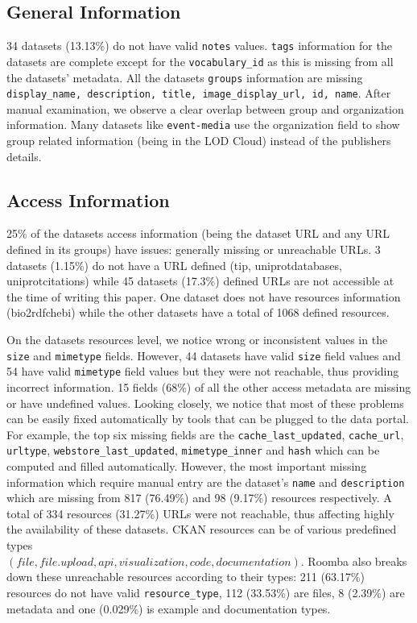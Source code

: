 \subsection{General Information}
34 datasets (13.13\%) do not have valid \texttt{notes} values. \texttt{tags} information for the datasets are complete except for the \texttt{vocabulary\_id} as this is missing from all the datasets' metadata. All the datasets \texttt{groups} information are missing \texttt{display\_name, description, title, image\_display\_url, id, name}. After manual examination, we observe a clear overlap between group and organization information. Many datasets like \texttt{event-media} use the organization field to show group related information (being in the LOD Cloud) instead of the publishers details.

\subsection{Access Information}
25\% of the datasets access information (being the dataset URL and any URL defined in its groups) have issues: generally missing or unreachable URLs. 3 datasets (1.15\%) do not have a URL defined (tip, uniprot\-databases, uniprot\-citations) while 45 datasets (17.3\%) defined URLs are not accessible at the time of writing this paper. One dataset does not have resources information (bio2rdf\-chebi) while the other datasets have a total of 1068 defined resources.

On the datasets resources level, we notice wrong or inconsistent values in the \texttt{size} and \texttt{mimetype} fields. However, 44 datasets have valid \texttt{size} field values and 54 have valid \texttt{mimetype} field values but they were not reachable, thus providing incorrect information. 15 fields (68\%) of all the other access metadata are missing or have undefined values. Looking closely, we notice that most of these problems can be easily fixed automatically by tools that can be plugged to the data portal. For example, the top six missing fields are the \texttt{cache\_last\_updated}, \texttt{cache\_url}, \texttt{url\-type}, \texttt{webstore\_last\_updated}, \texttt{mimetype\-\_inner} and \texttt{hash} which can be computed and filled automatically. However, the most important missing information which require manual entry are the dataset's \texttt{name} and \texttt{description} which are missing from 817 (76.49\%) and 98 (9.17\%) resources respectively. A total of 334 resources (31.27\%) URLs were not reachable, thus affecting highly the availability of these datasets. CKAN resources can be of various predefined types\\ $(file, file.upload, api, visualization, code, documentation)$. Roomba also breaks down these unreachable resources according to their types: 211 (63.17\%) resources do not have valid \texttt{resource\_type}, 112 (33.53\%) are files, 8 (2.39\%) are metadata and one (0.029\%) is example and documentation types.

